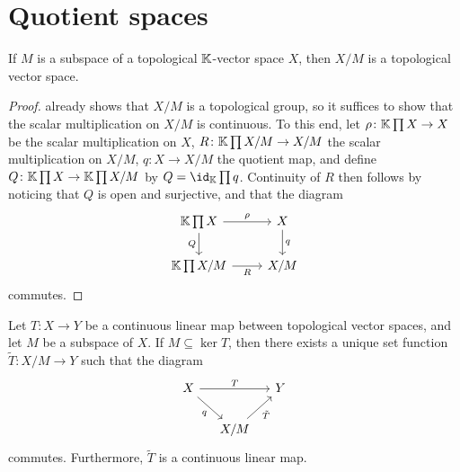 \documentclass[article, a4paper, 11pt, oneside]{memoir}
\numberwithin{equation}{chapter}
\begin{document}
\section{Quotient spaces}

\begin{theorem}
    If $M$ is a subspace of a topological $\mathbb{K}$-vector space $X$, then $X/M$ is a topological vector space.
\end{theorem}

\begin{proof}
     already shows that $X/M$ is a topological group, so it suffices to show that the scalar multiplication on $X/M$ is continuous. To this end, let $\rho \colon \mathbb{K} \prod X \to X$ be the scalar multiplication on $X$, $R \colon \mathbb{K} \prod X/M \to X/M$ the scalar multiplication on $X/M$, $q \colon X \to X/M$ the quotient map, and define $Q \colon \mathbb{K} \prod X \to \mathbb{K} \prod X/M$ by $Q = \id_\field \prod q$. Continuity of $R$ then follows by noticing that $Q$ is open and surjective, and that the diagram
    \begin{equation*}
        \begin{tikzcd}
            \field \prod X
                \ar[r, "\rho"]
                \ar[d, "Q", swap]
            & X
                \ar[d, "q"]
            \\
            \field \prod X/M
                \ar[r, "R", swap]
            & X/M
        \end{tikzcd}
    \end{equation*}
    commutes.
\end{proof}


\begin{proposition}
    \label{thm:quotient-space-factorisation}
    Let $T \colon X \to Y$ be a continuous linear map between topological vector spaces, and let $M$ be a subspace of $X$. If $M \subseteq \ker T$, then there exists a unique set function $\tilde{T} \colon X/M \to Y$ such that the diagram
    \begin{equation*}
        \begin{tikzcd}[column sep=small]
            X
                \ar[rr, "T"]
                \ar[dr, "q", swap]
            && Y
            \\
            & X/M
                \ar[ur, "\tilde{T}", swap]
        \end{tikzcd}
    \end{equation*}
    commutes. Furthermore, $\tilde{T}$ is a continuous linear map.
\end{proposition}
\end{document}
